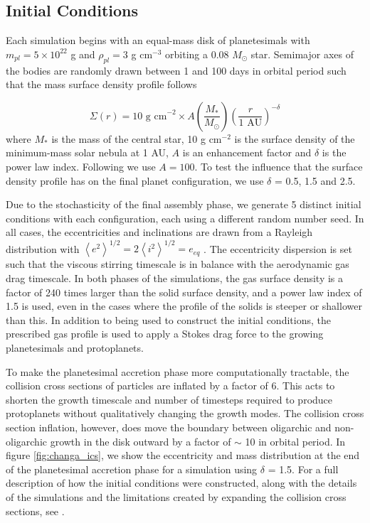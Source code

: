 \subsection{Initial Conditions} \label{sec:ics}

Each simulation begins with an equal-mass disk of planetesimals with $m_{pl} = 5 \times 10^{22}$ g and $\rho_{pl} = 3$ g cm$^{-3}$ orbiting a 0.08 $M_{\odot}$ star. Semimajor axes of the bodies are randomly drawn between 1 and 100 days in orbital period such that the mass surface density profile follows

\begin{equation}
	\Sigma(r) = \textrm{10 g cm}^{-2} \times A \left( \frac{M_{*}}{M_{\odot}} \right) \left( \frac{r}{\textrm{1 AU}} \right)^{-\delta}
\end{equation}
where $M_{*}$ is the mass of the central star, 10 g
cm$^{-2}$ is the surface density of the minimum-mass solar nebula
\cite[MMSN]{hayashi81} at 1 AU, $A$ is an enhancement factor and $\delta$ is the power law index. Following \cite{hansen12} we use $A = 100$. To test the influence that the surface density profile has on the final planet configuration, we use $\delta$ = 0.5, 1.5 and 2.5. 

Due to the stochasticity of the final assembly phase, we generate 5 distinct initial conditions with each configuration, each using a different random number seed. In all cases, the eccentricities and inclinations are drawn from a Rayleigh distribution with $\left< e^{2} \right>^{1/2} = 2\left<i^{2} \right>^{1/2} = e_{eq}$ \cite{ida93}. The eccentricity dispersion is set such that the viscous stirring timescale is in balance with the aerodynamic gas drag timescale. In both phases of the simulations, the gas surface density is a factor of 240 times larger than the solid surface density, and a power law index of 1.5 is used, even in the cases where the profile of the solids is steeper or shallower than this. In addition to being used to construct the initial conditions, the prescribed gas profile is used to apply a Stokes drag force to the growing planetesimals and protoplanets.

To make the planetesimal accretion phase more computationally tractable, the collision cross sections of particles are inflated by a factor of 6. This acts to shorten the growth timescale and number of timesteps required to produce protoplanets without qualitatively changing the growth modes. The collision cross section inflation, however, does move the boundary between oligarchic and non-oligarchic growth in the disk outward by a factor of $\sim$ 10 in orbital period. In figure \ref{fig:changa_ics}, we show the eccentricity and mass distribution at the end of the planetesimal accretion phase for a simulation using $\delta$ = 1.5. For a full description of how the initial conditions were constructed, along with the details of the simulations and the limitations created by expanding the collision cross sections, see \cite{wallace23}.

